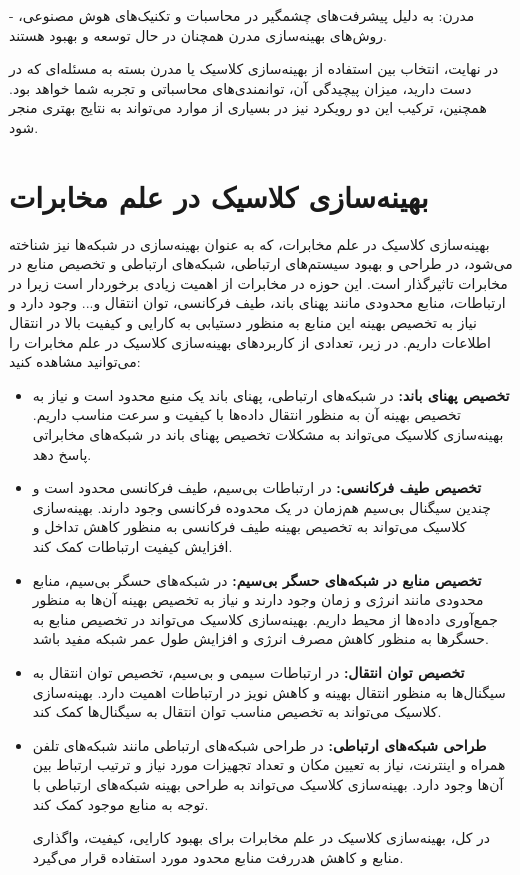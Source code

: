 - مدرن: به دلیل پیشرفت‌های چشمگیر در محاسبات و تکنیک‌های هوش مصنوعی، روش‌های بهینه‌سازی مدرن همچنان در حال توسعه و بهبود هستند.

\vspace{7mm}
در نهایت، انتخاب بین استفاده از بهینه‌سازی کلاسیک یا مدرن بسته به مسئله‌ای که در دست دارید، میزان پیچیدگی آن، توانمندی‌های محاسباتی و تجربه شما خواهد بود. همچنین، ترکیب این دو رویکرد نیز در بسیاری از موارد می‌تواند به نتایج بهتری منجر شود.
\section{بهینه‌سازی کلاسیک در علم مخابرات}

بهینه‌سازی کلاسیک در علم مخابرات، که به عنوان بهینه‌سازی در شبکه‌ها نیز شناخته می‌شود، در طراحی و بهبود سیستم‌های ارتباطی، شبکه‌های ارتباطی و تخصیص منابع در مخابرات تاثیرگذار است. این حوزه در مخابرات از اهمیت زیادی برخوردار است زیرا در ارتباطات، منابع محدودی مانند پهنای باند، طیف فرکانسی، توان انتقال و... وجود دارد و نیاز به تخصیص بهینه این منابع به منظور دستیابی به کارایی و کیفیت بالا در انتقال اطلاعات داریم. در زیر، تعدادی از کاربردهای بهینه‌سازی کلاسیک در علم مخابرات را می‌توانید مشاهده کنید:
\begin{itemize}
	\item \textbf{تخصیص پهنای باند:}
در شبکه‌های ارتباطی، پهنای باند یک منبع محدود است و نیاز به تخصیص بهینه آن به منظور انتقال داده‌ها با کیفیت و سرعت مناسب داریم. بهینه‌سازی کلاسیک می‌تواند به مشکلات تخصیص پهنای باند در شبکه‌های مخابراتی پاسخ دهد.

\item \textbf{تخصیص طیف فرکانسی:}
در ارتباطات بی‌سیم، طیف فرکانسی محدود است و چندین سیگنال بی‌سیم هم‌زمان در یک محدوده فرکانسی وجود دارند. بهینه‌سازی کلاسیک می‌تواند به تخصیص بهینه طیف فرکانسی به منظور کاهش تداخل و افزایش کیفیت ارتباطات کمک کند.

\item \textbf{تخصیص منابع در شبکه‌های حسگر بی‌سیم:}
در شبکه‌های حسگر بی‌سیم، منابع محدودی مانند انرژی و زمان وجود دارند و نیاز به تخصیص بهینه آن‌ها به منظور جمع‌آوری داده‌ها از محیط داریم. بهینه‌سازی کلاسیک می‌تواند در تخصیص منابع به حسگرها به منظور کاهش مصرف انرژی و افزایش طول عمر شبکه مفید باشد.

\item \textbf{تخصیص توان انتقال:}
در ارتباطات سیمی و بی‌سیم، تخصیص توان انتقال به سیگنال‌ها به منظور انتقال بهینه و کاهش نویز در ارتباطات اهمیت دارد. بهینه‌سازی کلاسیک می‌تواند به تخصیص مناسب توان انتقال به سیگنال‌ها کمک کند.

\item \textbf{طراحی شبکه‌های ارتباطی:}
در طراحی شبکه‌های ارتباطی مانند شبکه‌های تلفن همراه و اینترنت، نیاز به تعیین مکان و تعداد تجهیزات مورد نیاز و ترتیب ارتباط بین آن‌ها وجود دارد. بهینه‌سازی کلاسیک می‌تواند به طراحی بهینه شبکه‌های ارتباطی با توجه به منابع موجود کمک کند.

\vspace{5mm}

در کل، بهینه‌سازی کلاسیک در علم مخابرات برای بهبود کارایی، کیفیت، واگذاری منابع و کاهش هدررفت منابع محدود مورد استفاده قرار می‌گیرد.
\end{itemize}
\newpage
‌